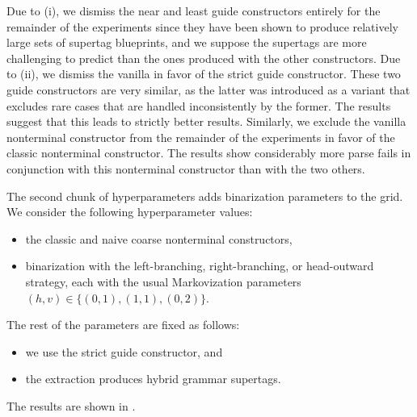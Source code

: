 \documentclass[../../document.tex]{subfiles}
\begin{document}
    Due to (i), we dismiss the near and least guide constructors entirely for the remainder of the experiments since they have been shown to produce relatively large sets of supertag blueprints, and we suppose the supertags are more challenging to predict than the ones produced with the other constructors.
    Due to (ii), we dismiss the vanilla in favor of the strict guide constructor.
    These two guide constructors are very similar, as the latter was introduced as a variant that excludes rare cases that are handled inconsistently by the former.
    The results suggest that this leads to strictly better results.
    Similarly, we exclude the vanilla nonterminal constructor from the remainder of the experiments in favor of the classic nonterminal constructor.
    The results show considerably more parse fails in conjunction with this nonterminal constructor than with the two others.

    The second chunk of hyperparameters adds binarization parameters to the grid.
    We consider the following hyperparameter values:
    \begin{itemize}
        \item the classic and naive coarse nonterminal constructors,
        \item binarization with the left-branching, right-branching, or head-outward strategy, each with the usual Markovization parameters \((h,v) \in \{(0,1), (1,1), (0,2)\}\).
    \end{itemize}
    The rest of the parameters are fixed as follows:
    \begin{itemize}
        \item we use the strict guide constructor, and
        \item the extraction produces hybrid grammar supertags.
    \end{itemize}
    The results are shown in .
\end{document}
